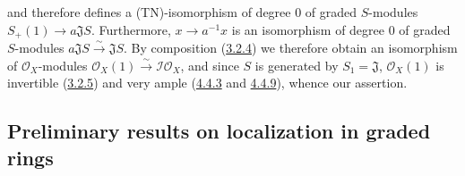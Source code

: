 and therefore defines a (TN)-isomorphism of degree $0$ of graded $S$-modules
$S_+(1)\to a\mathfrak{J}S$. Furthermore, $x\to a^{-1}x$ is an
isomorphism of degree $0$ of graded $S$-modules
$a\mathfrak{J}S\xrightarrow{\sim}\mathfrak{J}S$. By composition
(\hyperref[II.3.2.4]{3.2.4}) we therefore obtain an isomorphism of
$\mathcal{O}_X$-modules
$\mathcal{O}_X(1)\xrightarrow{\sim}\mathcal{I}\mathcal{O}_X$, and since $S$
is generated by $S_1=\mathfrak{J}$, $\mathcal{O}_X(1)$ is invertible
(\hyperref[II.3.2.5]{3.2.5}) and very ample
(\hyperref[II.4.4.3]{4.4.3} and \hyperref[II.4.4.9]{4.4.9}), whence our
assertion.

\subsection{Preliminary results on localization in graded rings}
\label{subsection:II.8.2}

